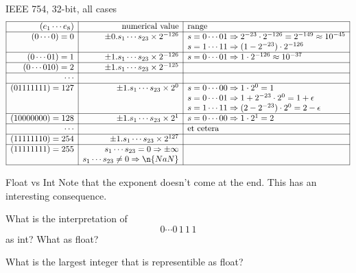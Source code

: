 \begin{numberedframe}{IEEE 754, 32-bit, all cases}
  \scriptsize
  \[
  \begin{array}{|r|r|l|}
    \hline
    (e_1\cdots e_8)&\hbox{numerical value}&\hbox{range}\\
    \hline
    (0\cdots0)=0& \pm 0.s_1\cdots s_{23}\times 2^{-126}
            &s=0\cdots 01\Rightarrow 2^{-23}\cdot 2^{-126}=2^{-149}\approx 10^{-45}\\
    &       &s=1\cdots 11\Rightarrow (1-2^{-23})\cdot 2^{-126}\\
    \hline
    (0\cdots 01)=1& \pm 1.s_1\cdots s_{23}\times 2^{-126}
            &s=0\cdots 01\Rightarrow 1 \cdot 2^{-126}\approx 10^{-37}\\
    \hline
    (0\cdots 010)=2& \pm 1.s_1\cdots s_{23}\times 2^{-125}&\\
    \hline
    \cdots&&\\
    \hline
    (01111111)=127 & \pm 1.s_1\cdots s_{23}\times 2^{0}
            &s=0\cdots 00\Rightarrow 1\cdot 2^{0}=1\\
    &       &s=0\cdots 01\Rightarrow 1+2^{-23}\cdot 2^{0}=1+\epsilon\\
    &       &s=1\cdots 11\Rightarrow (2-2^{-23})\cdot 2^{0}=2-\epsilon\\
    \hline
    (10000000)=128 & \pm 1.s_1\cdots s_{23}\times 2^{1}
            &s=0\cdots 00\Rightarrow 1\cdot 2^{1}=2\\
    \hline
    \cdots&
            &\hbox{et cetera}\\
    \hline
    (11111110)=254 & \pm 1.s_1\cdots s_{23}\times 2^{127}&\\
    \hline
    (11111111)=255 & s_1\cdots s_{23}=0 \Rightarrow \pm\infty &\\
                   & s_1\cdots s_{23}\not=0 \Rightarrow \n{NaN} &\\
    \hline
  \end{array}
  \]
\end{numberedframe}

\begin{exerciseframe}{Float vs Int}
  Note that the exponent doesn't come at the end. This has an interesting consequence.

  What is the interpretation of
  \[ 0\cdots 0\,1\,1\,1 \]
  as int? What as float?
\end{exerciseframe}

\begin{exerciseframe}
    What is the largest integer that is representible as float?
\end{exerciseframe}

